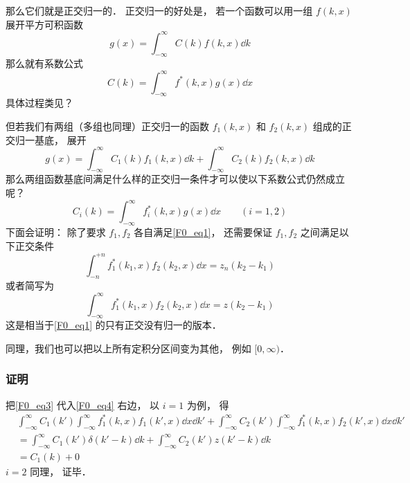 那么它们就是正交归一的． 正交归一的好处是， 若一个函数可以用一组 $f(k, x)$ 展开平方可积函数
\begin{equation}
g(x) = \int_{-\infty}^{\infty} C(k) f(k, x) \dd{k}
\end{equation}
那么就有系数公式
\begin{equation}
C(k) = \int_{-\infty}^{\infty} f^*(k, x)g(x)\dd{x}
\end{equation}
具体过程类见？

但若我们有两组（多组也同理）正交归一的函数 $f_1(k, x)$ 和 $f_2(k, x)$ 组成的正交归一基底， 展开
\begin{equation}\label{F0_eq3}
g(x) = \int_{-\infty}^{\infty} C_1(k) f_1(k, x) \dd{k} + \int_{-\infty}^{\infty} C_2(k) f_2(k, x) \dd{k}
\end{equation}
那么两组函数基底间满足什么样的正交归一条件才可以使以下系数公式仍然成立呢？
\begin{equation}\label{F0_eq4}
C_i(k) = \int_{-\infty}^{\infty} f_i^*(k, x)g(x)\dd{x} \qquad (i = 1,2)
\end{equation}
下面会证明： 除了要求 $f_1, f_2$ 各自满足\autoref{F0_eq1}， 还需要保证 $f_1, f_2$ 之间满足以下正交条件
\begin{equation}
\int_{-n}^{+n} f_1^*(k_1, x) f_2(k_2, x) \dd{x} = z_n(k_2 - k_1)
\end{equation}
或者简写为
\begin{equation}
\int_{-\infty}^{\infty} f_1^*(k_1, x) f_2(k_2, x) \dd{x} = z(k_2 - k_1)
\end{equation}
这是相当于\autoref{F0_eq1} 的只有正交没有归一的版本．

同理，我们也可以把以上所有定积分区间变为其他， 例如 $[0, \infty)$．

\subsubsection{证明}
把\autoref{F0_eq3} 代入\autoref{F0_eq4} 右边， 以 $i = 1$ 为例， 得
\begin{equation}
\begin{aligned}
&\int_{-\infty}^{\infty} C_1(k') \int_{-\infty}^{\infty} f_1^*(k, x) f_1(k', x)\dd{x} \dd{k'} + \int_{-\infty}^{\infty} C_2(k') \int_{-\infty}^{\infty} f_1^*(k, x)f_2(k', x)\dd{x} \dd{k'}\\
&= \int_{-\infty}^{\infty} C_1(k') \delta(k' - k) \dd{k} + \int_{-\infty}^{\infty} C_2(k') z(k' - k) \dd{k}\\
&= C_1(k) + 0
\end{aligned}
\end{equation}
$i = 2$ 同理， 证毕．

